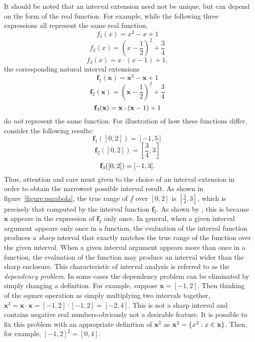 It should be noted that an interval extension need not be unique, but can
depend on the form of the real function.  For
example, while the following three expressions all represent the same
real function,
$$f_1(x) = x^2 - x + 1$$
$$f_2(x) = (x-\frac{1}{2})^2 + \frac{3}{4}$$
$$f_3(x) = x\cdot(x-1)+1,$$
the corresponding natural interval extensions
$$\mathbf{f}_1 (\mathbf{x}) = \mathbf{x}^2 - \mathbf{x} + 1$$ 
$$\mathbf{f}_2 (\mathbf{x}) = (\mathbf{x}-\frac{1}{2})^2 + \frac{3}{4}$$
$$\mathbf{f}_3 ({\bf x}) = {\bf x} \cdot ({\bf x} -1)+1$$
do {\it not} represent the same function.
For illustration of how these functions differ, consider the following results:
$$\mathbf{f}_1([0,2]) = [-1,5]$$  
$$\mathbf{f}_2([0,2]) = \left[ \frac{3}{4},3\right]$$ 
$${\bf f}_3([0,2]) = [-1,3].$$
Thus, attention and care must given to the choice of an interval extension in
order to obtain the narrowest possible interval result.
As shown in figure~\ref{figure:parabola}, the true range of 
$f$ over $[0,2]$ is $[\frac{3}{4},3]$, which is precisely that computed by 
the interval function 
$\mathbf{f}_2$.  As shown by \cite{Hansen:Sharp}, this is because $\mathbf{x}$
appears in the expression of $\mathbf{f}_2$ only once.  In general, when a 
given interval argument appears only once in a function, the evaluation of the
interval function produces a {\it sharp} interval that exactly matches the
true range of the function over the given interval.  
When a given interval argument appears more than once in a function, the
evaluation of the function may produce an interval wider than the sharp
enclosure.  This characteristic of interval analysis is referred to as the {\it
dependency problem}.  In some cases the dependency problem can be eliminated
by simply changing a definition.  For example, suppose $\mathbf{x} = [-1,2]$.
Then thinking of the square operation as simply multiplying two intervals
together, 
$\mathbf{x}^2 = \mathbf{x} \cdot \mathbf{x} = [-1,2] \cdot [-1,2] = [-2,4]$.
This is not a sharp interval and contains negative real numbers-obviously not
a desirable feature.  It is possible to fix this problem
with an appropriate definition of
$\mathbf{x}^2$  as $\mathbf{x}^2 = \{ x^2 : x \in {\bf x} \}$.  Then, for
example, $[-1,2]^2 = [0,4]$.

